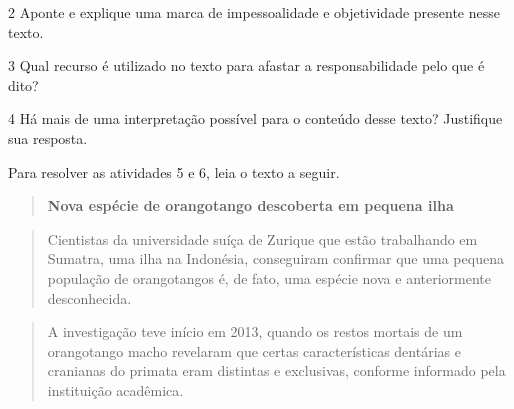 
\num{2} Aponte e explique uma marca de impessoalidade e objetividade
presente nesse texto.


\num{3} Qual recurso é utilizado no texto para afastar a
responsabilidade pelo que é dito?


\num{4} Há mais de uma interpretação possível para o conteúdo desse
texto? Justifique sua resposta.


Para resolver as atividades 5 e 6, leia o texto a seguir.

\begin{quote}
\textbf{Nova espécie de orangotango descoberta em pequena ilha}
\end{quote}

\begin{quote}
Cientistas da universidade suíça de Zurique que estão trabalhando em
Sumatra, uma ilha na Indonésia, conseguiram confirmar que uma pequena
população de orangotangos é, de fato, uma espécie nova e anteriormente
desconhecida.
\end{quote}

\begin{quote}
A investigação teve início em 2013, quando os restos mortais de um
orangotango macho revelaram que certas características dentárias e
cranianas do primata eram distintas e exclusivas, conforme informado
pela instituição acadêmica.
\end{quote}



